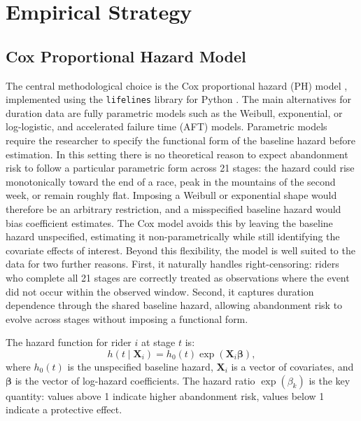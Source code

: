 \section{Empirical Strategy}
\label{sec:empirical_strategy}

\subsection{Cox Proportional Hazard Model}

The central methodological choice is the Cox proportional hazard (PH) model \parencite{cox1972regression, cleves2010survival}, implemented using the \texttt{lifelines} library for Python \parencite{davidson2023lifelines}. The main alternatives for duration data are fully parametric models such as the Weibull, exponential, or log-logistic, and accelerated failure time (AFT) models. Parametric models require the researcher to specify the functional form of the baseline hazard before estimation. In this setting there is no theoretical reason to expect abandonment risk to follow a particular parametric form across 21 stages: the hazard could rise monotonically toward the end of a race, peak in the mountains of the second week, or remain roughly flat. Imposing a Weibull or exponential shape would therefore be an arbitrary restriction, and a misspecified baseline hazard would bias coefficient estimates. The Cox model avoids this by leaving the baseline hazard unspecified, estimating it non-parametrically while still identifying the covariate effects of interest. Beyond this flexibility, the model is well suited to the data for two further reasons. First, it naturally handles right-censoring: riders who complete all 21 stages are correctly treated as observations where the event did not occur within the observed window. Second, it captures duration dependence through the shared baseline hazard, allowing abandonment risk to evolve across stages without imposing a functional form.

The hazard function for rider $i$ at stage $t$ is:
\begin{equation}
    h(t \mid \mathbf{X}_i) = h_0(t) \exp\!\left(\mathbf{X}_i \boldsymbol{\beta}\right),
\end{equation}
where $h_0(t)$ is the unspecified baseline hazard, $\mathbf{X}_i$ is a vector of covariates, and $\boldsymbol{\beta}$ is the vector of log-hazard coefficients. The hazard ratio $\exp(\beta_k)$ is the key quantity: values above 1 indicate higher abandonment risk, values below 1 indicate a protective effect.

